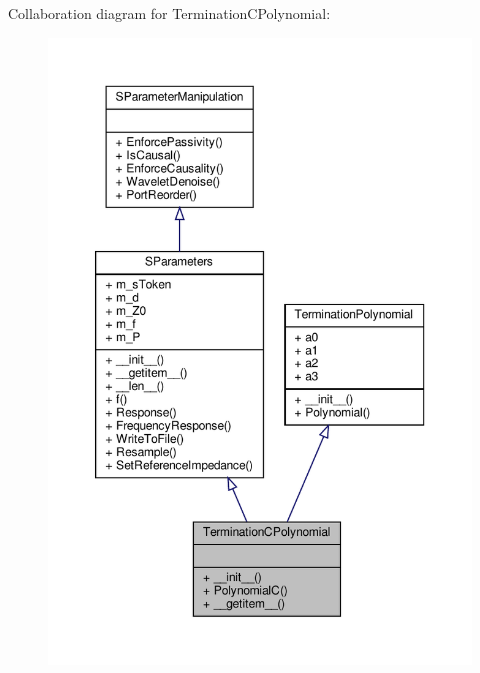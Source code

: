 Collaboration diagram for Termination\+C\+Polynomial\+:
\nopagebreak
\begin{figure}[H]
\begin{center}
\leavevmode
\includegraphics[width=350pt]{classSignalIntegrity_1_1Measurement_1_1CalKit_1_1Standards_1_1TerminationPolynomial_1_1TerminationCPolynomial__coll__graph}
\end{center}
\end{figure}
